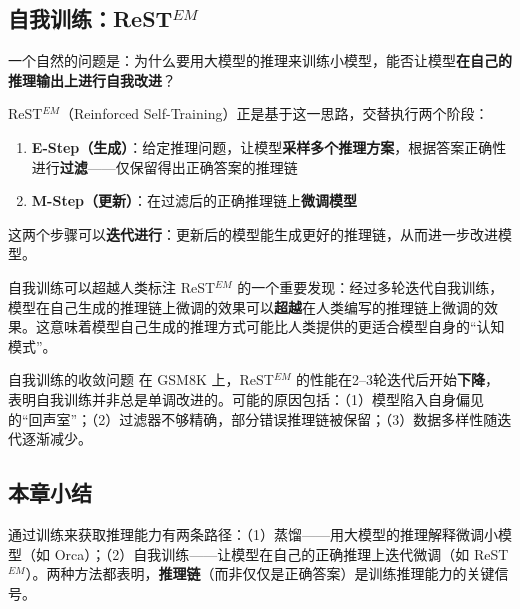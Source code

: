 \documentclass[a4paper]{article}
\begin{document}
\subsection{自我训练：ReST$^{EM}$}

一个自然的问题是：为什么要用大模型的推理来训练小模型，能否让模型\textbf{在自己的推理输出上进行自我改进}？

ReST$^{EM}$（Reinforced Self-Training）正是基于这一思路，交替执行两个阶段：

\begin{enumerate}
    \item \textbf{E-Step（生成）}：给定推理问题，让模型\textbf{采样多个推理方案}，根据答案正确性进行\textbf{过滤}——仅保留得出正确答案的推理链
    \item \textbf{M-Step（更新）}：在过滤后的正确推理链上\textbf{微调模型}
\end{enumerate}

这两个步骤可以\textbf{迭代进行}：更新后的模型能生成更好的推理链，从而进一步改进模型。




\begin{importantbox}{自我训练可以超越人类标注}
ReST$^{EM}$ 的一个重要发现：经过多轮迭代自我训练，模型在自己生成的推理链上微调的效果可以\textbf{超越}在人类编写的推理链上微调的效果。这意味着模型自己生成的推理方式可能比人类提供的更适合模型自身的``认知模式''。
\end{importantbox}

\begin{warningbox}{自我训练的收敛问题}
在 GSM8K 上，ReST$^{EM}$ 的性能在2--3轮迭代后开始\textbf{下降}，表明自我训练并非总是单调改进的。可能的原因包括：（1）模型陷入自身偏见的``回声室''；（2）过滤器不够精确，部分错误推理链被保留；（3）数据多样性随迭代逐渐减少。
\end{warningbox}

\subsection{本章小结}

通过训练来获取推理能力有两条路径：（1）蒸馏——用大模型的推理解释微调小模型（如 Orca）；（2）自我训练——让模型在自己的正确推理上迭代微调（如 ReST$^{EM}$）。两种方法都表明，\textbf{推理链}（而非仅仅是正确答案）是训练推理能力的关键信号。

\end{document}
